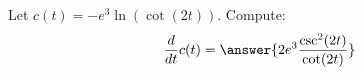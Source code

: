 \documentclass{ximera}
\begin{document}
\begin{exercise}
	Let $c(t) = -e^{3} \ln\left(\cot (2 t )\right)$. Compute:
	\[ \ddt c(t) =\answer{2e^{3} \frac{\csc^2( 2 t)}{\cot (2 t)}} \]
\end{exercise}
\end{document}
